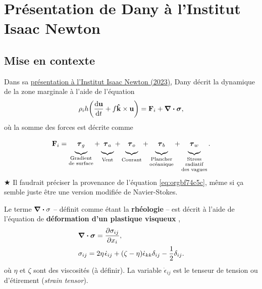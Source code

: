 \documentclass[10pt]{article}
\numberwithin{equation}{section}
\newcommand{\kvf}{\vb{\hat{k}}}
\newcommand{\uu}{\vb{u}}
\newcommand{\short}{\vphantom{pA}}
\newcommand{\tall}{\vphantom{pA^{x^x}_p}}
\newcommand{\grande}{\vphantom{\frac{1}{xx}}}
\newcommand{\pt}{\hspace{1pt}} %
\begin{document}
\section{Présentation de Dany à l'Institut Isaac Newton}
\label{sec:org397290d}

\subsection{Mise en contexte}
\label{sec:org2e94db7}

Dans sa \href{https://www.youtube.com/watch?v=\_V7ozTp6SJM}{présentation à l'Institut Isaac Newton (2023)}, Dany décrit la dynamique de la zone marginale à l'aide de l'équation
\begin{equation}
\label{eq:orgbf74c5c}
   \rho_i h \qty(\dv{\uu}{t} + f \kvf\times\uu) = \vb{F}_i + \divergence{\boldsymbol{\sigma}},
\end{equation}
où la somme des forces est décrite comme
\begin{equation}
   \vb{F}_i =
    \underbrace{\grande\boldsymbol{\tau}_g}_{\substack{\text{Gradient}\short\\\text{de surface}}}
   +\underbrace{\grande\boldsymbol{\tau}_a}_{\tall\text{Vent}}
   +\underbrace{\grande\boldsymbol{\tau}_o}_{\tall\text{Courant}}
   +\underbrace{\grande\boldsymbol{\tau}_b}_{\substack{\text{Plancher}\vphantom{A^2p}\\\text{océanique}}}
   +\underbrace{\grande\boldsymbol{\tau}_w}_{\substack{\text{Stress}\short\vphantom{A^1}\\\text{radiatif}\short\\\text{des vagues}}} .
\end{equation}
\(\bigstar\) Il faudrait préciser la provenance de l'équation \ref{eq:orgbf74c5c}, même si ça semble juste être une version modifiée de Navier-Stokes.\bigskip

Le terme \(\divergence{\sigma}\) -- définit comme étant la \textbf{rhéologie} -- est décrit à l'aide de l'équation de \textbf{déformation d'un plastique visqueux} \autocite{hunke1997elastic},
\begin{align}
   & \divergence{\boldsymbol{\sigma}} = \pdv{\sigma_{ij}}{x_i},\\
   & \sigma_{ij} = 2\eta \pt\dot{\epsilon}_{ij} + \qty(\zeta - \eta) \dot{\epsilon}_{kk} \delta_{ij} - \frac{1}{2} \delta_{ij}.
\end{align}
où \(\eta\) et \(\zeta\) sont des viscosités (à définir).
La variable \(\dot{\epsilon}_{ij}\) est le tenseur de tension ou d'étirement (\emph{strain tensor}).\bigskip
\end{document}
